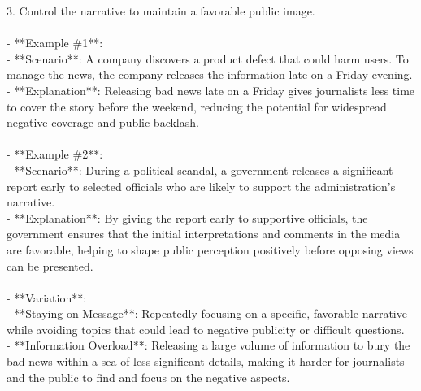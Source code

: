 \documentclass[a4paper,12pt,single,pdftex]{scrbook}
\begin{document}
    
        3. Control the narrative to maintain a favorable public image.
    \\

    
      
    \\

    
      - **Example \#1**:
    \\

    
        - **Scenario**: A company discovers a product defect that could harm users. To manage the news, the company releases the information late on a Friday evening.
    \\

    
        - **Explanation**: Releasing bad news late on a Friday gives journalists less time to cover the story before the weekend, reducing the potential for widespread negative coverage and public backlash.
    \\

    
      
    \\

    
      - **Example \#2**:
    \\

    
        - **Scenario**: During a political scandal, a government releases a significant report early to selected officials who are likely to support the administration's narrative.
    \\

    
        - **Explanation**: By giving the report early to supportive officials, the government ensures that the initial interpretations and comments in the media are favorable, helping to shape public perception positively before opposing views can be presented.
    \\

    
      
    \\

    
      - **Variation**:
    \\

    
        - **Staying on Message**: Repeatedly focusing on a specific, favorable narrative while avoiding topics that could lead to negative publicity or difficult questions.
    \\

    
        - **Information Overload**: Releasing a large volume of information to bury the bad news within a sea of less significant details, making it harder for journalists and the public to find and focus on the negative aspects.
    \\
\end{document}
